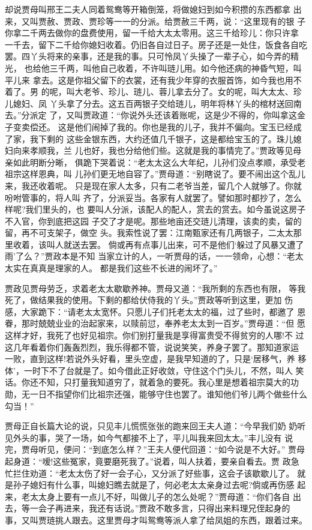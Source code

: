 却说贾母叫邢王二夫人同着鸳鸯等开箱倒笼，将做媳妇到如今积攒的东西都拿
出来，又叫贾赦、贾政、贾珍等一一的分派。给贾赦三千两，说：“这里现有的银
子你拿二千两去做你的盘费使用，留一千给大太太零用。这三千给珍儿：你只许拿
一千去，留下二千给你媳妇收着。仍旧各自过日子。房子还是一处住，饭食各自吃
罢。四丫头将来的亲事，还是我的事。只可怜凤丫头操了一辈子心，如今弄的精光，
也给他三千两，叫他自己收着，不许叫琏儿用。如今他还病的神昏气短，叫平儿来
拿去。这是你祖父留下的衣裳，还有我少年穿的衣服首饰，如今我也用不着了。男
的呢，叫大老爷、珍儿、琏儿、蓉儿拿去分了。女的呢，叫大太太、珍儿媳妇、凤
丫头拿了分去。这五百两银子交给琏儿，明年将林丫头的棺材送回南去。”分派定
了，又叫贾政道：“你说外头还该着账呢，这是少不得的，你叫拿这金子变卖偿还。
这是他们闹掉了我的。你也是我的儿子，我并不偏向。宝玉已经成了家，我下剩的
这些金银东西，大约还值几千银子，这是都给宝玉的了。珠儿媳妇向来孝顺我，兰
儿也好，我也分给他们些。这就是我的事情完了。”贾政等见母亲如此明断分晰，
俱跪下哭着说：“老太太这么大年纪，儿孙们没点孝顺，承受老祖宗这样恩典，叫
儿孙们更无地自容了。”贾母道：“别瞎说了。要不闹出这个乱儿来，我还收着呢。
只是现在家人太多，只有二老爷当差，留几个人就够了。你就吩咐管事的，将人叫
齐了，分派妥当。各家有人就罢了。譬如那时都抄了，怎么样呢?我们里头的，也
要叫人分派，该配人的配人，赏去的赏去。如今虽说这房子不入官，你到底把这园
子交了才是呢。那些地亩还交琏儿清理，该卖的卖，留的留，再不可支架子，做空
头。我索性说了罢：江南甄家还有几两银子，二太太那里收着，该叫人就送去罢。
倘或再有点事儿出来，可不是他们‘躲过了风暴又遭了雨’了么？”贾政本是不知
当家立计的人，一听贾母的话，一一领命，心想：“老太太实在真真是理家的人。
都是我们这些不长进的闹坏了。”

贾政见贾母劳乏，求着老太太歇歇养神。贾母又道：“我所剩的东西也有限，
等我死了，做结果我的使用。下剩的都给伏侍我的丫头。”贾政等听到这里，更加
伤感，大家跪下：“请老太太宽怀。只愿儿子们托老太太的福，过了些时，都邀了
恩眷，那时兢兢业业的治起家来，以赎前愆，奉养老太太到一百岁。”贾母道：“但
愿这样才好，我死了也好见祖宗。你们别打量我是享得富贵受不得贫穷的人哪!不
过这几年看着你们轰轰烈烈，我乐得都不管，说说笑笑，养身子罢了。那知道家运
一败，直到这样!若说外头好看，里头空虚，是我早知道的了，只是‘居移气，养
移体’，一时下不了台就是了。如今借此正好收敛，守住这个门头儿，不然，叫人
笑话。你还不知，只打量我知道穷了，就着急的要死。我心里是想着祖宗莫大的功
勋，无一日不指望你们比祖宗还强，能够守住也罢了。谁知他们爷儿两个做些什么
勾当！”

贾母正自长篇大论的说，只见丰儿慌慌张张的跑来回王夫人道：“今早我们奶
奶听见外头的事，哭了一场，如今气都接不上了，平儿叫我来回太太。”丰儿没有
说完，贾母听见，便问：“到底怎么样？”王夫人便代回道：“如今说是不大好。”
贾母起身道：“嗳!这些冤家，竟要磨死我了。”说着，叫人扶着，要亲自看去。贾
政急忙拦住劝道：“老太太伤了好一会子心，又分派了好些事，这会子该歇歇儿了。
就是孙子媳妇有什么事，叫媳妇瞧去就是了，何必老太太亲身过去呢?倘或再伤感
起来，老太太身上要有一点儿不好，叫做儿子的怎么处呢？”贾母道：“你们各自
出去，等一会子再进来，我还有话说。”贾政不敢多言，只得出来料理兄侄起身的
事，又叫贾琏挑人跟去。这里贾母才叫鸳鸯等派人拿了给凤姐的东西，跟着过来。

